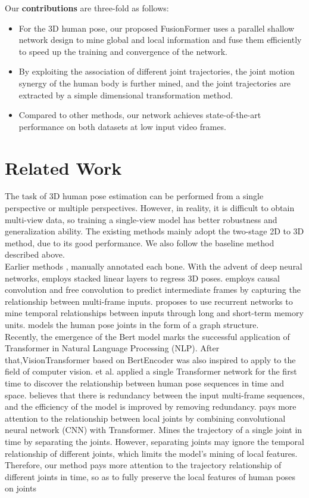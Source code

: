 \documentclass{article}
\begin{document}
Our \textbf{contributions} are three-fold as follows:
\begin{itemize}
\item For the 3D human pose, our proposed FusionFormer uses a parallel shallow network design to mine global and local information and fuse them efficiently to speed up the training and convergence of the network.  
\item By exploiting the association of different joint trajectories, the joint motion synergy of the human body is further mined, and the joint trajectories are extracted by a simple dimensional transformation method.
\item Compared to other methods, our network achieves state-of-the-art performance on both datasets at low input video frames.
\end{itemize}


\section{Related Work}
The task of 3D human pose estimation can be performed from a single perspective or multiple perspectives. However, in reality, it is difficult to obtain multi-view data, so training a single-view model has better robustness and generalization ability. The existing methods mainly adopt the two-stage 2D to 3D method, due to its good performance. We also follow the baseline method described above.\\
Earlier methods \cite{cheng2019occlusion} , manually annotated each bone. With the advent of deep neural networks, \cite{chen2021anatomy} employs stacked linear layers to regress 3D poses. \cite{pavllo20193d} employs causal convolution and free convolution to predict intermediate frames by capturing the relationship between multi-frame inputs. \cite{8626436} proposes to use recurrent networks to mine temporal relationships between inputs through long and short-term memory units. \cite{zou2021modulated} models the human pose joints in the form of a graph structure.\\
Recently, the emergence of the Bert model marks the successful application of Transformer in Natural Language Processing (NLP). After that,Vision\;Transformer based on Bert\;Encoder was also inspired to apply to the field of computer vision. \cite{zheng20213d} et al. applied a single Transformer network for the first time to discover the relationship between human pose sequences in time and space. \cite{2021Exploiting} believes that there is redundancy between the input multi-frame sequences, and the efficiency of the model is improved by removing redundancy. \cite{2022CrossFormer} pays more attention to the relationship between local joints by combining convolutional neural network (CNN) with Transformer. \cite{zhang2022mixste} Mines the trajectory of a single joint in time by separating the joints. However, separating joints may ignore the temporal relationship of different joints, which limits the model's mining of local features.\\
Therefore, our method pays more attention to the trajectory relationship of different joints in time, so as to fully preserve the local features of human poses on joints
\end{document}
